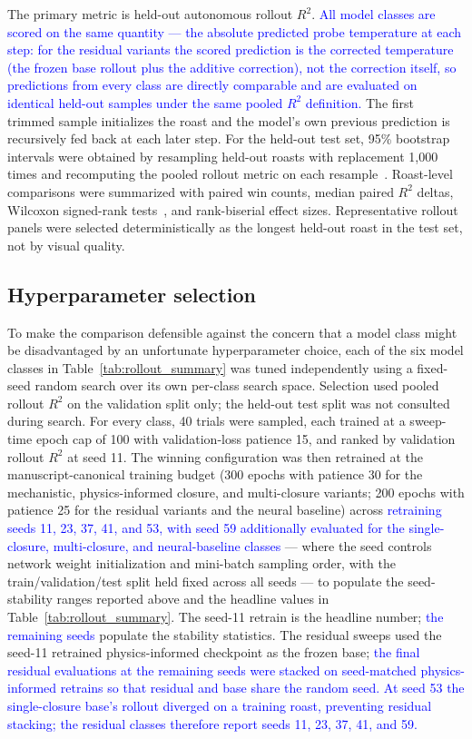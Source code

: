 \documentclass[fleqn,10pt]{wlscirep}
\newcommand{\rev}[1]{\textcolor{blue}{#1}}
\begin{document}
The primary metric is held-out autonomous rollout $R^2$. \rev{All model classes are scored on the same quantity --- the absolute predicted probe temperature at each step: for the residual variants the scored prediction is the corrected temperature (the frozen base rollout plus the additive correction), not the correction itself, so predictions from every class are directly comparable and are evaluated on identical held-out samples under the same pooled $R^2$ definition.} The first trimmed sample initializes the roast and the model's own previous prediction is recursively fed back at each later step. For the held-out test set, 95\% bootstrap intervals were obtained by resampling held-out roasts with replacement 1{,}000 times and recomputing the pooled rollout metric on each resample~\cite{efron1979}. Roast-level comparisons were summarized with paired win counts, median paired $R^2$ deltas, Wilcoxon signed-rank tests~\cite{wilcoxon1945}, and rank-biserial effect sizes. Representative rollout panels were selected deterministically as the longest held-out roast in the test set, not by visual quality.

\subsection*{Hyperparameter selection}

To make the comparison defensible against the concern that a model class might be disadvantaged by an unfortunate hyperparameter choice, each of the six model classes in Table~\ref{tab:rollout_summary} was tuned independently using a fixed-seed random search over its own per-class search space. Selection used pooled rollout $R^2$ on the validation split only; the held-out test split was not consulted during search. For every class, 40 trials were sampled, each trained at a sweep-time epoch cap of 100 with validation-loss patience 15, and ranked by validation rollout $R^2$ at seed 11. The winning configuration was then retrained at the manuscript-canonical training budget (300 epochs with patience 30 for the mechanistic, physics-informed closure, and multi-closure variants; 200 epochs with patience 25 for the residual variants and the neural baseline) across \rev{retraining seeds 11, 23, 37, 41, and 53, with seed 59 additionally evaluated for the single-closure, multi-closure, and neural-baseline classes} --- where the seed controls network weight initialization and mini-batch sampling order, with the train/validation/test split held fixed across all seeds --- to populate the seed-stability ranges reported above and the headline values in Table~\ref{tab:rollout_summary}. The seed-11 retrain is the headline number; \rev{the remaining seeds} populate the stability statistics. The residual sweeps used the seed-11 retrained physics-informed checkpoint as the frozen base; \rev{the final residual evaluations at the remaining seeds were stacked on seed-matched physics-informed retrains so that residual and base share the random seed. At seed 53 the single-closure base's rollout diverged on a training roast, preventing residual stacking; the residual classes therefore report seeds 11, 23, 37, 41, and 59.}
\end{document}
